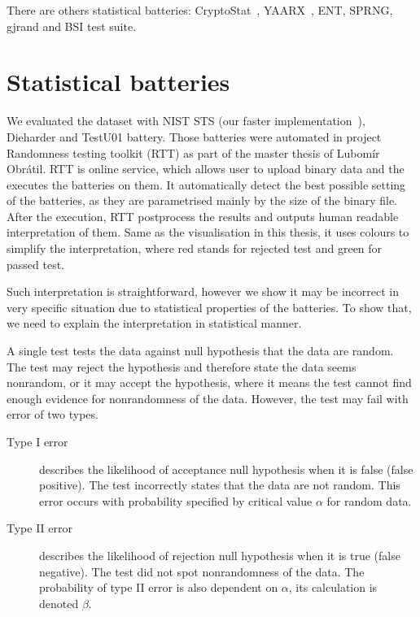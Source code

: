 \documentclass[
  print, %
  Table,   %
  nolof,     %
  nolot,     %
  11pt, %
  oneside  %
]{fithesis3}
\begin{document}
There are others statistical batteries: CryptoStat~\cite{kaminsky2013cryptostat}, YAARX~\cite{biryukov2014automatic}, ENT, SPRNG, gjrand and BSI test suite.


\section{Statistical batteries}
\label{sec:relatwork-stat}


We evaluated the dataset with NIST STS (our faster implementation~\cite{sys2016algorithm}), Dieharder and TestU01 battery. Those batteries were automated in project Randomness testing toolkit (RTT) as part of the master thesis of Lubomír Obrátil. RTT is online service, which allows user to upload binary data and the executes the batteries on them. It automatically detect the best possible setting of the batteries, as they are parametrised mainly by the size of the binary file. After the execution, RTT postprocess the results and outputs human readable interpretation of them. Same as the visualisation in this thesis, it uses colours to simplify the interpretation, where red stands for rejected test and green for passed test.

Such interpretation is straightforward, however we show it may be incorrect in very specific situation due to statistical properties of the batteries. To show that, we need to explain the interpretation in statistical manner.

A single test tests the data against null hypothesis that the data are random. The test may reject the hypothesis and therefore state the data seems nonrandom, or it may accept the hypothesis, where it means the test cannot find enough evidence for nonrandomness of the data. However, the test may fail with error of two types.

\begin{description}
    \item[Type I error] describes the likelihood of acceptance null hypothesis when it is false (false positive). The test incorrectly states that the data are not random. This error occurs with probability specified by critical value $\alpha$ for random data.
    \item[Type II error] describes the likelihood of rejection null hypothesis when it is true (false negative). The test did not spot nonrandomness of the data. The probability of type II error is also dependent on $\alpha$, its calculation is denoted $\beta$.
\end{description}
\end{document}
